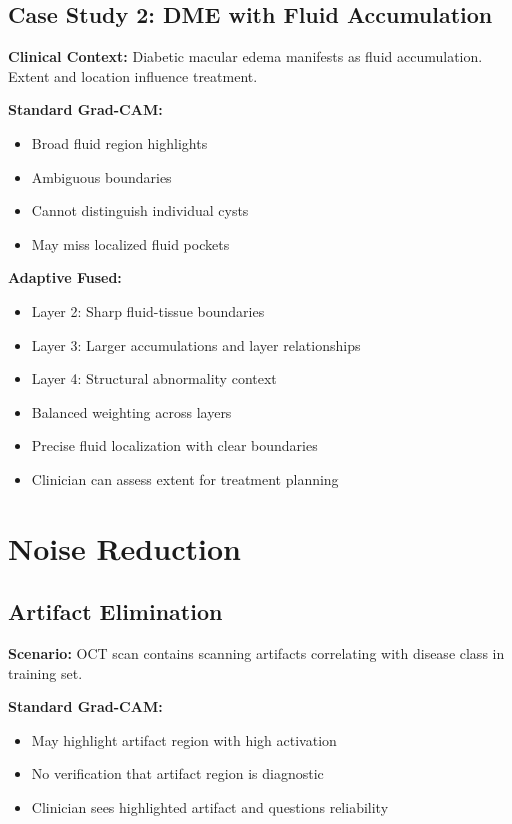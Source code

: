 \documentclass[12pt,a4paper,oneside]{book}
\begin{document}
\subsection{Case Study 2: DME with Fluid Accumulation}

\textbf{Clinical Context:} Diabetic macular edema manifests as fluid accumulation. Extent and location influence treatment.

\textbf{Standard Grad-CAM:}
\begin{itemize}
  \item Broad fluid region highlights
  \item Ambiguous boundaries
  \item Cannot distinguish individual cysts
  \item May miss localized fluid pockets
\end{itemize}

\textbf{Adaptive Fused:}
\begin{itemize}
  \item Layer 2: Sharp fluid-tissue boundaries
  \item Layer 3: Larger accumulations and layer relationships
  \item Layer 4: Structural abnormality context
  \item Balanced weighting across layers
  \item Precise fluid localization with clear boundaries
  \item Clinician can assess extent for treatment planning
\end{itemize}

\section{Noise Reduction}

\subsection{Artifact Elimination}

\textbf{Scenario:} OCT scan contains scanning artifacts correlating with disease class in training set.

\textbf{Standard Grad-CAM:}
\begin{itemize}
  \item May highlight artifact region with high activation
  \item No verification that artifact region is diagnostic
  \item Clinician sees highlighted artifact and questions reliability
\end{itemize}
\end{document}
